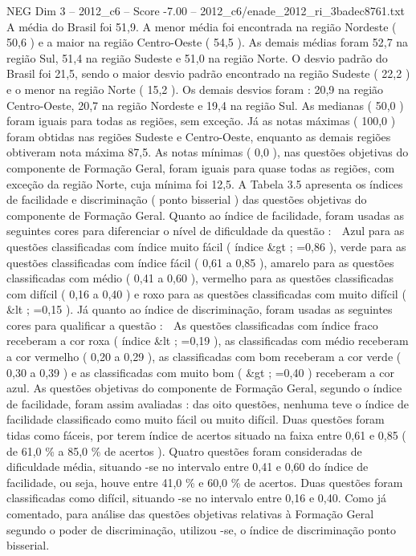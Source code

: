 \begin{textsample}{NEG Dim 3 – 2012\_c6 – Score -7.00 – 2012\_c6/enade\_2012\_ri\_3badec8761.txt}
A média do Brasil foi 51,9.
A menor média foi encontrada na região Nordeste ( 50,6 ) e a maior na região Centro-Oeste ( 54,5 ).
As demais médias foram 52,7 na região Sul, 51,4 na região Sudeste e 51,0 na região Norte.
O desvio padrão do Brasil foi 21,5, sendo o maior desvio padrão encontrado na região Sudeste ( 22,2 ) e o menor na região Norte ( 15,2 ).
Os demais desvios foram : 20,9 na região Centro-Oeste, 20,7 na região Nordeste e 19,4 na região Sul.
As medianas ( 50,0 ) foram iguais para todas as regiões, sem exceção.
Já as notas máximas ( 100,0 ) foram obtidas nas regiões Sudeste e Centro-Oeste, enquanto as demais regiões obtiveram nota máxima 87,5.
As notas mínimas ( 0,0 ), nas questões objetivas do componente de Formação Geral, foram iguais para quase todas as regiões, com exceção da região Norte, cuja mínima foi 12,5.
A Tabela 3.5 apresenta os índices de facilidade e discriminação ( ponto bisserial ) das questões objetivas do componente de Formação Geral.
Quanto ao índice de facilidade, foram usadas as seguintes cores para diferenciar o nível de dificuldade da questão :  Azul para as questões classificadas com índice muito fácil ( índice \&gt ; =0,86 ), verde para as questões classificadas com índice fácil ( 0,61 a 0,85 ), amarelo para as questões classificadas com médio ( 0,41 a 0,60 ), vermelho para as questões classificadas com difícil ( 0,16 a 0,40 ) e roxo para as questões classificadas com muito difícil ( \&lt ; =0,15 ).
Já quanto ao índice de discriminação, foram usadas as seguintes cores para qualificar a questão :  As questões classificadas com índice fraco receberam a cor roxa ( índice \&lt ; =0,19 ), as classificadas com médio receberam a cor vermelho ( 0,20 a 0,29 ), as classificadas com bom receberam a cor verde ( 0,30 a 0,39 ) e as classificadas com muito bom ( \&gt ; =0,40 ) receberam a cor azul.
As questões objetivas do componente de Formação Geral, segundo o índice de facilidade, foram assim avaliadas : das oito questões, nenhuma teve o índice de facilidade classificado como muito fácil ou muito difícil.
Duas questões foram tidas como fáceis, por terem índice de acertos situado na faixa entre 0,61 e 0,85 ( de 61,0 \% a 85,0 \% de acertos ).
Quatro questões foram consideradas de dificuldade média, situando -se no intervalo entre 0,41 e 0,60 do índice de facilidade, ou seja, houve entre 41,0 \% e 60,0 \% de acertos.
Duas questões foram classificadas como difícil, situando -se no intervalo entre 0,16 e 0,40.
Como já comentado, para análise das questões objetivas relativas à Formação Geral segundo o poder de discriminação, utilizou -se, o índice de discriminação ponto bisserial.

\end{textsample}
